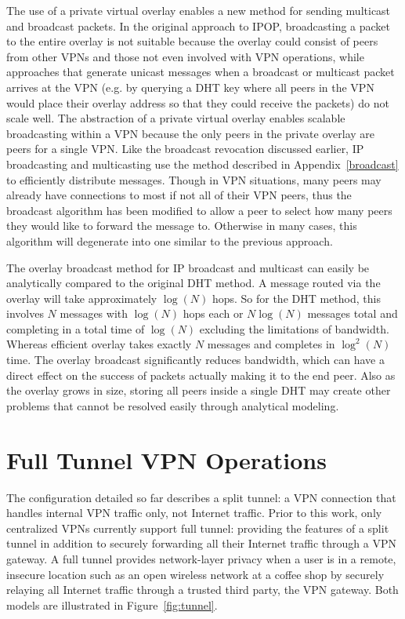 The use of a private virtual overlay enables a new method for sending multicast
and broadcast packets. In the original approach to IPOP, broadcasting a packet
to the entire overlay  is not suitable because the overlay could consist of
peers from other VPNs and those not even involved with VPN operations, while
approaches that generate unicast messages when a broadcast or multicast packet
arrives at the VPN (e.g. by querying a DHT key where all peers in the VPN would
place their overlay address so that they could receive the packets) do not
scale well. The abstraction of a private virtual overlay enables scalable
broadcasting within a VPN because the only peers in the private overlay are
peers for a single VPN.  Like the broadcast revocation discussed earlier, IP
broadcasting and multicasting use the method described in
Appendix~\ref{broadcast} to efficiently distribute messages.  Though in VPN
situations, many peers may already have connections to most if not all of their
VPN peers, thus the broadcast algorithm has been modified to allow a peer to
select how many peers they would like to forward the message to.  Otherwise in
many cases, this algorithm will degenerate into one similar to the previous
approach.  

The overlay broadcast method for IP broadcast and multicast can easily be
analytically compared to the original DHT method.  A message routed via the
overlay will take approximately $\log(N)$ hops.  So for the DHT method, this
involves $N$ messages with $\log(N)$ hops each or $N\log(N)$ messages total and
completing in a total time of $\log(N)$ excluding the limitations of bandwidth.
Whereas efficient overlay takes exactly $N$ messages and completes in
$\log^2(N)$ time.  The overlay broadcast significantly reduces bandwidth, which
can have a direct effect on the success of packets actually making it to the
end peer.  Also as the overlay grows in size, storing all peers inside a single
DHT may create other problems that cannot be resolved easily through analytical
modeling.

\section{Full Tunnel VPN Operations}
\label{full_tunnel}

The configuration detailed so far describes a split tunnel: a VPN connection
that handles internal VPN traffic only, not Internet traffic.  Prior to this
work, only centralized VPNs currently support full tunnel: providing the
features of a split tunnel in addition to securely forwarding all their
Internet traffic through a VPN gateway.  A full tunnel provides network-layer
privacy when a user is in a remote, insecure location such as an open wireless
network at a coffee shop by securely relaying all Internet traffic through a
trusted third party, the VPN gateway.  Both models are illustrated in
Figure~\ref{fig:tunnel}.

